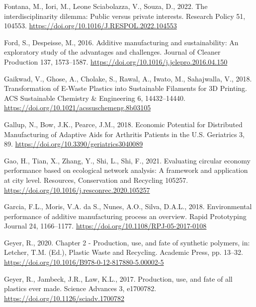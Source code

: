 \documentclass[
  12pt,
  number,
  review]{elsarticle}
\newlength{\cslhangindent}
\newlength{\cslentryspacingunit} %
\newenvironment{CSLReferences}[2] %
 {%
  \setlength{\parindent}{0pt}
  \ifodd #1
  \let\oldpar\par
  \def\par{\hangindent=\cslhangindent\oldpar}
  \fi
  \setlength{\parskip}{#2\cslentryspacingunit}
 }%
 {}
\begin{document}
\begin{CSLReferences}{1}{0}
\leavevmode{}%
Fontana, M., Iori, M., Leone Sciabolazza, V., Souza, D., 2022. The
interdisciplinarity dilemma: {Public} versus private interests. Research
Policy 51, 104553. \url{https://doi.org/10.1016/J.RESPOL.2022.104553}

\leavevmode{}%
Ford, S., Despeisse, M., 2016. Additive manufacturing and
sustainability: An exploratory study of the advantages and challenges.
Journal of Cleaner Production 137, 1573--1587.
\url{https://doi.org/10.1016/j.jclepro.2016.04.150}

\leavevmode{}%
Gaikwad, V., Ghose, A., Cholake, S., Rawal, A., Iwato, M., Sahajwalla,
V., 2018. Transformation of {E-Waste Plastics} into {Sustainable
Filaments} for {3D Printing}. ACS Sustainable Chemistry \& Engineering
6, 14432--14440. \url{https://doi.org/10.1021/acssuschemeng.8b03105}

\leavevmode{}%
Gallup, N., Bow, J.K., Pearce, J.M., 2018. Economic {Potential} for
{Distributed Manufacturing} of {Adaptive Aids} for {Arthritis Patients}
in the {U}.{S}. Geriatrics 3, 89.
\url{https://doi.org/10.3390/geriatrics3040089}

\leavevmode{}%
Gao, H., Tian, X., Zhang, Y., Shi, L., Shi, F., 2021. Evaluating
circular economy performance based on ecological network analysis: {A}
framework and application at city level. Resources, Conservation and
Recycling 105257. \url{https://doi.org/10.1016/j.resconrec.2020.105257}

\leavevmode{}%
Garcia, F.L., Moris, V.A. da S., Nunes, A.O., Silva, D.A.L., 2018.
Environmental performance of additive manufacturing process
\textendash{} an overview. Rapid Prototyping Journal 24, 1166--1177.
\url{https://doi.org/10.1108/RPJ-05-2017-0108}

\leavevmode{}%
Geyer, R., 2020. Chapter 2 - {Production}, use, and fate of synthetic
polymers, in: Letcher, T.M. (Ed.), Plastic {Waste} and {Recycling}.
{Academic Press}, pp. 13--32.
\url{https://doi.org/10.1016/B978-0-12-817880-5.00002-5}

\leavevmode{}%
Geyer, R., Jambeck, J.R., Law, K.L., 2017. Production, use, and fate of
all plastics ever made. Science Advances 3, e1700782.
\url{https://doi.org/10.1126/sciadv.1700782}


\end{CSLReferences}
\end{document}
